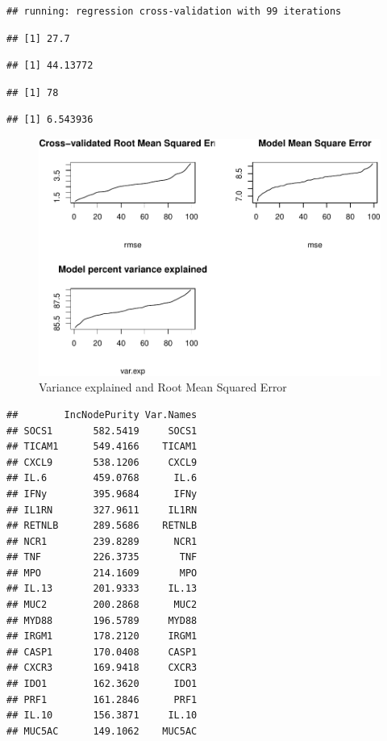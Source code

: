 \documentclass[webpdf,large,contemporary,namedate]{oup-authoring-template}
\theoremstyle{thmstyleone}
\theoremstyle{thmstyletwo}
\theoremstyle{thmstylethree}
\begin{document}
\begin{verbatim}
## running: regression cross-validation with 99 iterations
\end{verbatim}

\begin{verbatim}
## [1] 27.7
\end{verbatim}

\begin{verbatim}
## [1] 44.13772
\end{verbatim}

\begin{verbatim}
## [1] 78
\end{verbatim}

\begin{verbatim}
## [1] 6.543936
\end{verbatim}

\begin{figure}[th]
\includegraphics[width=1\linewidth]{Article_hybrids_tolerance_files/figure-latex/fig4-1} \caption{Variance explained and Root Mean Squared Error}\label{fig:fig4}
\end{figure}

\begin{verbatim}
##        IncNodePurity Var.Names
## SOCS1       582.5419     SOCS1
## TICAM1      549.4166    TICAM1
## CXCL9       538.1206     CXCL9
## IL.6        459.0768      IL.6
## IFNy        395.9684      IFNy
## IL1RN       327.9611     IL1RN
## RETNLB      289.5686    RETNLB
## NCR1        239.8289      NCR1
## TNF         226.3735       TNF
## MPO         214.1609       MPO
## IL.13       201.9333     IL.13
## MUC2        200.2868      MUC2
## MYD88       196.5789     MYD88
## IRGM1       178.2120     IRGM1
## CASP1       170.0408     CASP1
## CXCR3       169.9418     CXCR3
## IDO1        162.3620      IDO1
## PRF1        161.2846      PRF1
## IL.10       156.3871     IL.10
## MUC5AC      149.1062    MUC5AC
\end{verbatim}
\end{document}
